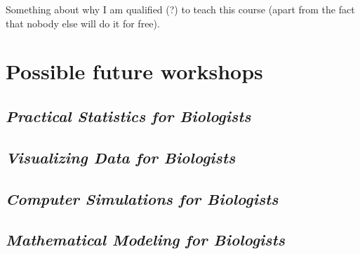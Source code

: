\documentclass[11pt,letter]{article}
\begin{document}
Something about why I am qualified (?) to teach this course (apart
from the fact that nobody else will do it for free).
\section{Possible future workshops}
\label{sec-3}
\subsection{\emph{Practical Statistics for Biologists}}
\label{sec-3-1}
\subsection{\emph{Visualizing Data for Biologists}}
\label{sec-3-2}
\subsection{\emph{Computer Simulations for Biologists}}
\label{sec-3-3}
\subsection{\emph{Mathematical Modeling for Biologists}}
\label{sec-3-4}
\end{document}
